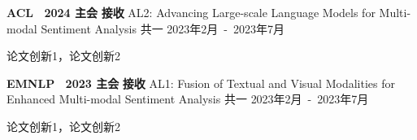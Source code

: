 

\begin{cventries}

  \cventry
    {\textbf{ACL \ 2024 主会} \quad \textbf{接收}} %
    {AL2: Advancing Large-scale Language Models for Multi-modal Sentiment Analysis} %
    {共一} %
    {2023年2月\ -\ 2023年7月} %
    {
      \begin{cvitems} %
        \item {论文创新1，论文创新2}
      \end{cvitems}
    }

  \cventry
    {\textbf{EMNLP \ 2023 主会} \quad \textbf{接收}} %
    {AL1: Fusion of Textual and Visual Modalities for Enhanced Multi-modal Sentiment Analysis} %
    {共一} %
    {2023年2月\ -\ 2023年7月} %
    {
      \begin{cvitems} %
        \item {论文创新1，论文创新2}
      \end{cvitems}
    }

\end{cventries}
